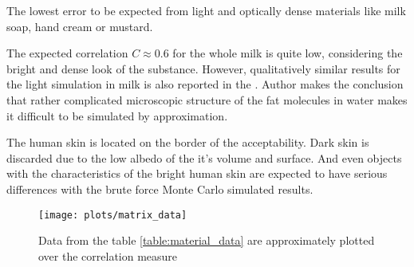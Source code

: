 The lowest error to be expected from light and optically dense materials like milk soap, hand cream
or mustard.

The expected correlation $C\approx0.6$ for the whole milk is quite low, considering the bright and
dense look of the substance. However, qualitatively similar results for the light simulation in milk
is also reported in the \cite{Donner:2009:EBM}. Author makes the conclusion that rather
complicated microscopic structure of the fat molecules in water makes it difficult to be simulated
by approximation.

The human skin is located on the border of the acceptability. Dark skin is discarded due to
the low albedo of the it's volume and surface. And even objects with the characteristics of the
bright human skin are expected to have serious differences with the brute force Monte Carlo
simulated results.

\begin{figure}
    \texttt{[image: plots/matrix\_data]}
    \caption{Data from the table \ref{table:material_data} are approximately plotted over the
    correlation measure}
    \label{fig:material_props_data}
\end{figure}